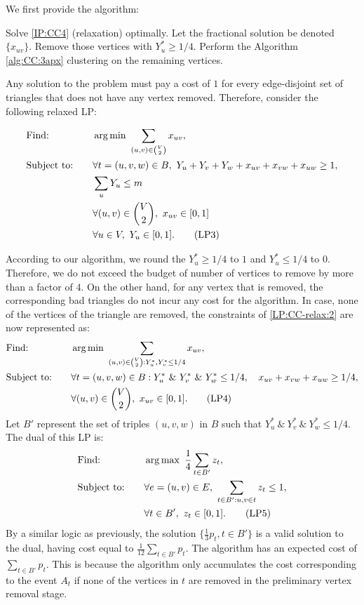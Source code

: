 We first provide the algorithm:

Solve \ref{IP:CC4} (relaxation) optimally. Let the fractional solution be denoted $\{ x_{uv}  \}$. Remove those vertices with $Y_u^* \ge 1/4$. Perform the Algorithm  \ref{alg:CC:3apx} clustering on the remaining vertices.

Any solution to the problem must pay a cost of $1$ for every edge-disjoint set of triangles that does not have any vertex removed. Therefore, consider the following relaxed LP:

\begin{alignat}{3} \label{LP:CC-relax:2}
		&\text{Find: } && \operatorname*{arg\,min}\ \sum_{(u,v) \in \binom{V}{2}} x_{uv}, \nonumber\\
		&\text{Subject to:} \quad && \forall t = (u,v,w) \in B ,\ Y_u + Y_v + Y_w + x_{uv} + x_{vw} + x_{uw} \ge 1, \nonumber\\
		& && \sum_{u} Y_u \le m \nonumber\\
		& && \forall (u,v) \in \binom{V}{2},\ x_{uv} \in [ 0,1 ] \nonumber\\
		& && \forall u \in V,\ Y_u \in [0,1]. \tag{LP3}
\end{alignat}

According to our algorithm, we round the $Y_u^* \ge 1/4$ to $1$ and $Y_u^* \le 1/4$ to $0$. Therefore, we do not exceed the budget of number of vertices to remove by more than a factor of $4$. On the other hand, for any vertex that is removed, the corresponding bad triangles do not incur any cost for the algorithm. In case, none of the vertices of the triangle are removed, the constraints of \ref{LP:CC-relax:2} are now represented as:
\begin{alignat}{3} \label{LP:CC-relax-reduced:2}
		&\text{Find: } && \operatorname*{arg\,min}\ \sum_{(u,v) \in \binom{V}{2} : Y_u^*, Y_v^* \le 1/4} x_{uv}, \nonumber\\
		&\text{Subject to:} \quad && \forall t = (u,v,w) \in B : Y_u^* \ \&\ Y_v^* \ \&\ Y_w^* \le 1/4,\quad x_{uv} + x_{vw} + x_{uw} \ge 1/4, \nonumber\\
		& && \forall (u,v) \in \binom{V}{2},\ x_{uv} \in [ 0,1 ]. \tag{LP4}
\end{alignat}
Let $B'$ represent the set of triples $(u,v,w)$ in $B$ such that $Y_u^* \ \&\ Y_v^* \ \&\ Y_w^* \le 1/4$.
The dual of this LP is:
\begin{alignat}{3} \label{LP:CC-relax-reduced-dual:2}
		&\text{Find: } && \operatorname*{arg\,max}\ \frac{1}{4} \sum_{t \in B'} z_t, \nonumber\\
		&\text{Subject to:} \quad && \forall e = (u,v) \in E ,\ \sum_{t \in B' : u,v \in t} z_t \le 1, \nonumber\\
		& && \forall t \in B',\ z_{t} \in [ 0,1 ].\tag{LP5}
\end{alignat}
By a similar logic as previously, the solution $\{ \frac{1}{3} p_t, t \in B'\}$ is a valid solution to the dual, having cost equal to $\frac{1}{12} \sum_{t \in B'} p_t$. The algorithm has an expected cost of $\sum_{t \in B'} p_t$. This is because the algorithm only accumulates the cost corresponding to the event $A_t$ if none of the vertices in $t$ are removed in the preliminary vertex removal stage.

